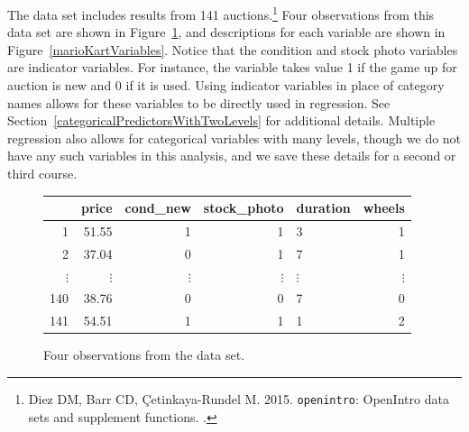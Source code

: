 The data set  includes results from 141 auctions.\footnote{Diez DM, Barr CD, \c{C}etinkaya-Rundel M. 2015. \texttt{openintro}: OpenIntro data sets and supplement functions. .} Four observations from this data set are shown in Figure~\ref{marioKartDataMatrix}, and descriptions for each variable are shown in Figure~\ref{marioKartVariables}. Notice that the condition and stock photo variables are indicator variables. For instance, the  variable takes value 1 if the game up for auction is new and 0 if it is used. Using indicator variables in place of category names allows for these variables to be directly used in regression. See Section~\ref{categoricalPredictorsWithTwoLevels} for additional details. Multiple regression also allows for categorical variables with many levels, though we do not have any such variables in this analysis, and we save these details for a second or third course.

\begin{figure}[ht]
\centering
\begin{tabular}{rrrrlr}
  \hline
 & price & cond\_\hspace{0.3mm}new & stock\_\hspace{0.3mm}photo & duration & wheels \\ 
  \hline
1 & 51.55 &   1 & 1 & 3 &   1 \\ 
  2 & 37.04 &  0 &  1 & 7 &   1 \\ 
$\vdots$ &$\vdots$ &$\vdots$ &$\vdots$ &$\vdots$ &$\vdots$ \\
  140 & 38.76 &  0 &  0 & 7 &   0 \\ 
  141 & 54.51 &  1 &  1 & 1 &   2 \\ 
   \hline
\end{tabular}
\caption{Four observations from the  data set.}
\label{marioKartDataMatrix}
\end{figure}

